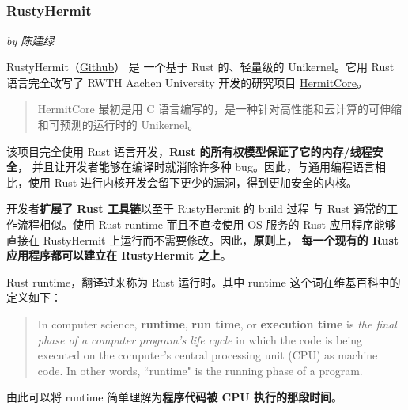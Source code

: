 \documentclass[UTF8,fontset=none,linespread=1.15]{ctexart}
\let\nosupcite\cite
\renewcommand*{\cite}[1]{\textsuperscript{\nosupcite{#1}}}
\newcommand{\sectionauthor}[1]{%
\vspace*{-5ex}
\noindent\textrm{\hfill\textit{by #1}}
\vspace*{3ex}\par}
\begin{document}
\subsubsection[RustyHermit]{RustyHermit\cite{bib:14-rusty-hermit}\cite{bib:15-rust-runtime}\cite{bib:16-rust-runtime2}\cite{bib:17-rusty-hermit2}}\sectionauthor{陈建绿}

RustyHermit（\hyperlink{https://github.com/hermitcore/rusty-hermit}{Github}） 是
一个基于 Rust 的、轻量级的 Unikernel。它用 Rust 语言完全改写了 RWTH Aachen University
 开发的研究项目 \hyperlink{http://hermitcore.org/}{HermitCore}。

\begin{quote}
HermitCore 最初是用 C 语言编写的，是一种针对高性能和云计算的可伸缩和可预测的运行时的 Unikernel。
\end{quote}

该项目完全使用 Rust 语言开发，\textbf{Rust 的所有权模型保证了它的内存/线程安全}，
并且让开发者能够在编译时就消除许多种 bug。因此，与通用编程语言相比，使用 Rust
 进行内核开发会留下更少的漏洞，得到更加安全的内核。

开发者\textbf{扩展了 Rust 工具链}以至于 RustyHermit 的 build 过程
与 Rust 通常的工作流程相似。使用 Rust runtime 而且不直接使用 OS 服务的
 Rust 应用程序能够直接在 RustyHermit 上运行而不需要修改。因此，\textbf{原则上，
 每一个现有的 Rust 应用程序都可以建立在 RustyHermit 之上}。

Rust runtime，翻译过来称为 Rust 运行时。其中 runtime 这个词在维基百科中的定义如下：
\begin{quote}
In computer science, \textbf{runtime}, \textbf{run time}, or \textbf{execution time} is \textit{the final phase of a computer program's life cycle} in which the code is being executed on the computer's central processing unit (CPU) as machine code. In other words, ``runtime" is the running phase of a program.
\end{quote}
由此可以将 runtime 简单理解为\textbf{程序代码被 CPU 执行的那段时间}。
\end{document}

